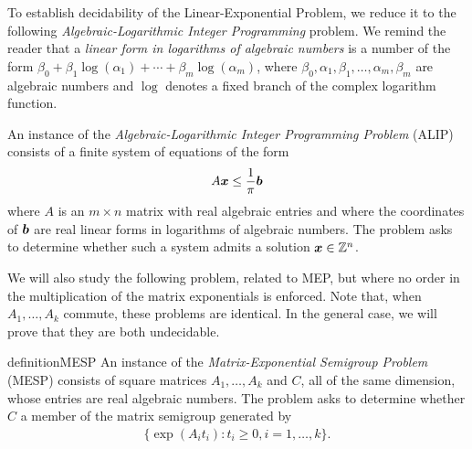 To establish decidability of the Linear-Exponential Problem, we reduce
it to the following
\emph{Algebraic-Logarithmic Integer Programming}
problem.  We remind the reader that a \emph{linear form in logarithms of algebraic numbers}
is a number of the form
$\beta_{0} + \beta_{1} \log(\alpha_{1}) + \cdots + \beta_{m}
\log(\alpha_{m})$,
where
$\beta_{0}, \alpha_{1}, \beta_{1}, \ldots, \alpha_{m}, \beta_{m}$ are
algebraic numbers and $\log$ denotes a fixed branch of the complex
logarithm function.



\begin{definition}
An instance of the \emph{Algebraic-Logarithmic Integer Programming Problem} (ALIP) consists of a finite system of equations of the form
\begin{align*}
A \boldsymbol{x} \leq \frac{1}{\pi} \boldsymbol{b}
\end{align*}
where $A$ is an $m\times n$ matrix with real algebraic entries and
where the coordinates of $\boldsymbol{b}$ are real linear forms in
logarithms of algebraic numbers. The problem asks to determine whether
such a system admits a solution $\boldsymbol{x} \in \mathbb{Z}^{n}$.
\end{definition}

We will also study the following problem, related to MEP, but where no order in the multiplication of the matrix exponentials is enforced. Note that, when $A_{1}, \ldots, A_{k}$ commute, these problems are identical. In the general case, we will prove that they are both undecidable.

\begin{restatable}{definition}{MESP}
  \label{def:MESP}
  An instance of the \emph{Matrix-Exponential Semigroup Problem} (MESP) consists of
  square matrices $A_{1}, \ldots, A_{k}$ and $C$, all of the same
  dimension, whose entries are real algebraic numbers.  The problem
 asks to determine whether $C$ a member of the matrix semigroup generated by
\begin{align*}
\lbrace \exp(A_{i} t_{i}) : t_{i} \geq 0 , i=1,\ldots,k \rbrace.
\end{align*}
\end{restatable}

